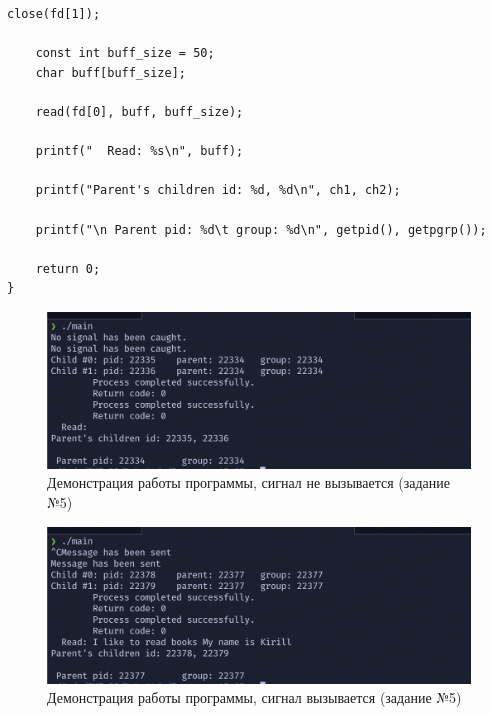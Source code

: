 \documentclass[a4paper,14pt]{article}
\begin{document}
\begin{lstlisting}[style=C, caption=Системный вызов signal().]
	close(fd[1]);

	const int buff_size = 50;
	char buff[buff_size];

	read(fd[0], buff, buff_size);

	printf("  Read: %s\n", buff);

	printf("Parent's children id: %d, %d\n", ch1, ch2);

	printf("\n Parent pid: %d\t group: %d\n", getpid(), getpgrp());

	return 0;
}
\end{lstlisting}

\begin{figure}[ht]
	\centering
	\includegraphics[scale=0.7]{5_1.png}
	\caption{Демонстрация работы программы, сигнал не вызывается (задание №5)}
	\label{fig:5_1}
\end{figure}

\begin{figure}[ht]
	\centering
	\includegraphics[scale=0.7]{5_2.png}
	\caption{Демонстрация работы программы, сигнал вызывается (задание №5)}
	\label{fig:5_2}
\end{figure}
\end{document}
